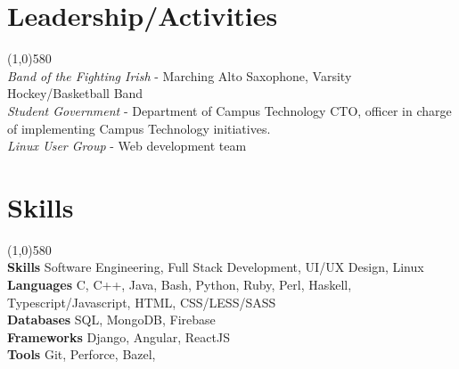 \documentclass[9pt]{article}
\begin{document}
  \vspace{-16pt}
  \section*{Leadership/Activities}
    \vspace{-16pt}
    \line(1,0){580}\\
    \textit{Band of the Fighting Irish}
    -
    Marching Alto Saxophone, Varsity Hockey/Basketball Band
    \\
    \textit{Student Government}
    -
    Department of Campus Technology CTO, officer in charge of implementing Campus Technology initiatives.
    \\
    \textit{Linux User Group}
    -
    Web development team
    
  \vspace{-16pt}
  \section*{Skills}
    \vspace{-16pt}
    \line(1,0){580}\\
    \textbf{Skills}
    Software Engineering,
    Full Stack Development,
    UI/UX Design,
    Linux
    \\
    \textbf{Languages}
    C,
    C++,
    Java,
    Bash,
    Python,
    Ruby,
    Perl,
    Haskell,
    Typescript/Javascript,
    HTML,
    CSS/LESS/SASS
    \\
    \textbf{Databases}
    SQL,
    MongoDB,
    Firebase
    \\
    \textbf{Frameworks}
    Django,
    Angular,
    ReactJS
    \\
    \textbf{Tools}
    Git,
    Perforce,
    Bazel,
    \\
\end{document}
